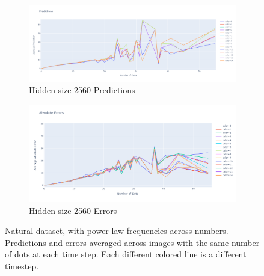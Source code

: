 \documentclass{article}
\begin{document}
\begin{figure}[H]
  \medskip

  \begin{subfigure}{0.6\textwidth}
    \centering
    \includegraphics[width=.8\linewidth]{template/10x_0to55_prediction_samescale.png}
    \caption{Hidden size 2560 Predictions}
    \label{fig:6}
  \end{subfigure}
  \begin{subfigure}{0.6\textwidth}\quad
    \centering
    \includegraphics[width=.8\linewidth]{template/10x_0to55_error_samescale.png}
    \caption{Hidden size 2560 Errors}
    \label{fig:3}
  \end{subfigure}
  \caption{Natural dataset, with power law frequencies across numbers. Predictions and errors averaged across images with the same number of dots at each time step. Each different colored line is a different timestep.}
  \label{fig:images}
\end{figure}

\newpage
\end{document}
